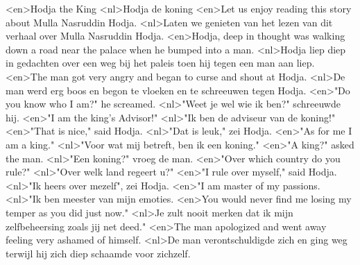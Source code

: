<en>Hodja the King
<nl>Hodja de koning
<en>Let us enjoy reading this story about Mulla Nasruddin Hodja.
<nl>Laten we genieten van het lezen van dit verhaal over  Mulla Nasruddin Hodja.
<en>Hodja, deep in thought was walking down a road near the palace when he bumped into a man.
<nl>Hodja liep diep in gedachten over een weg bij het paleis toen hij tegen een man aan liep.
<en>The man got very angry and began to curse and shout at Hodja.
<nl>De man werd erg boos en begon te vloeken en te schreeuwen tegen Hodja.
<en>"Do you know who I am?" he screamed.
<nl>"Weet je wel wie ik ben?" schreeuwde hij.
<en>"I am the king's Advisor!"
<nl>"Ik ben de adviseur van de koning!"
<en>"That is nice," said Hodja.
<nl>"Dat is leuk," zei Hodja.
<en>"As for me I am a king."
<nl>"Voor wat mij betreft, ben ik een koning."
<en>"A king?" asked the man.
<nl>"Een koning?" vroeg de man.
<en>"Over which country do you rule?"
<nl>"Over welk land regeert u?"
<en>"I rule over myself," said Hodja.
<nl>"Ik heers over mezelf", zei Hodja.
<en>"I am master of my passions.
<nl>"Ik ben meester van mijn emoties.
<en>You would never find me losing my temper as you did just now."
<nl>Je zult nooit merken dat ik mijn zelfbeheersing zoals jij net deed."
<en>The man apologized and went away feeling very ashamed of himself.
<nl>De man verontschuldigde zich en ging weg terwijl hij zich diep schaamde voor zichzelf.
